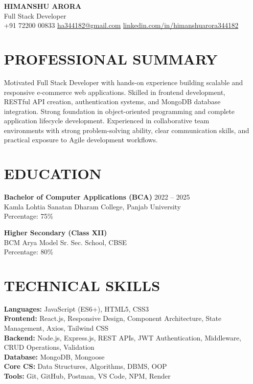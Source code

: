 \documentclass[a4paper,10.5pt]{article}
\begin{document}
\begin{center}
{\LARGE \textbf{HIMANSHU ARORA}}\\
\vspace{4pt}
Full Stack Developer\\
\vspace{4pt}
+91 72200 00833 \quad
\href{mailto:ha344182@gmail.com}{ha344182@gmail.com} \quad
\href{https://www.linkedin.com/in/himanshuarora344182}{linkedin.com/in/himanshuarora344182}
\end{center}

\section*{PROFESSIONAL SUMMARY}

Motivated Full Stack Developer with hands-on experience building scalable and responsive e-commerce web applications. Skilled in frontend development, RESTful API creation, authentication systems, and MongoDB database integration. Strong foundation in object-oriented programming and complete application lifecycle development. Experienced in collaborative team environments with strong problem-solving ability, clear communication skills, and practical exposure to Agile development workflows.

\section*{EDUCATION}

\textbf{Bachelor of Computer Applications (BCA)} \hfill 2022 -- 2025 \\
Kamla Lohtia Sanatan Dharam College, Panjab University \\
Percentage: 75\%

\vspace{4pt}

\textbf{Higher Secondary (Class XII)} \\
BCM Arya Model Sr. Sec. School, CBSE \\
Percentage: 80\%

\section*{TECHNICAL SKILLS}

\textbf{Languages:} JavaScript (ES6+), HTML5, CSS3 \\
\textbf{Frontend:} React.js, Responsive Design, Component Architecture, State Management, Axios, Tailwind CSS \\
\textbf{Backend:} Node.js, Express.js, REST APIs, JWT Authentication, Middleware, CRUD Operations, Validation \\
\textbf{Database:} MongoDB, Mongoose \\
\textbf{Core CS:} Data Structures, Algorithms, DBMS, OOP \\
\textbf{Tools:} Git, GitHub, Postman, VS Code, NPM, Render
\end{document}
